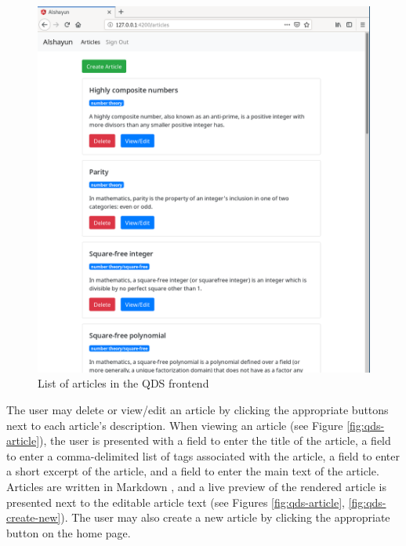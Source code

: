 \documentclass[12pt]{report}
\begin{document}
\begin{figure}
    \centering
    \includegraphics[scale=0.4]{images/qds-articles.png}
    \caption{List of articles in the QDS frontend}
    \label{fig:qds-articles}
\end{figure}

The user may delete or view/edit an article by clicking the appropriate buttons
next to each article's description. When viewing an article (see Figure
\ref{fig:qds-article}), the user is presented with a field to enter the title of
the article, a field to enter a comma-delimited list of tags associated with the
article, a field to enter a short excerpt of the article, and a field to enter
the main text of the article. Articles are written in Markdown \cite{markdown},
and a live preview of the rendered article is presented next to the editable
article text (see Figures \ref{fig:qds-article}, \ref{fig:qds-create-new}).  The
user may also create a new article by clicking the appropriate button on the
home page.
\end{document}
